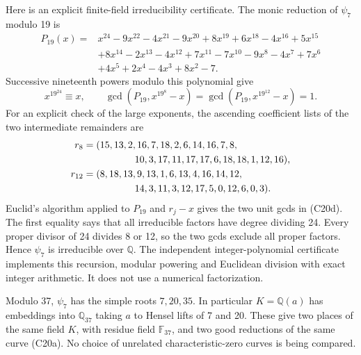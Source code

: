 \documentclass[11pt]{article}
\newcommand{\Q}{\mathbb Q}\newcommand{\C}{\mathbb C}\newcommand{\Z}{\mathbb Z}\newcommand{\R}{\mathbb R}\newcommand{\A}{\mathbb A}\newcommand{\OO}{\mathcal O}
\newcommand{\F}{\mathbb F}
\theoremstyle{definition}\newtheorem{definition}[theorem]{Definition}\newtheorem{remark}[theorem]{Remark}
\begin{document}
Here is an explicit finite-field irreducibility certificate.
The monic reduction of $\psi_7$ modulo 19 is
\begin{align*}
 P_{19}(x)={}&x^{24}-9x^{22}-4x^{21}-9x^{20}
       +8x^{19}+6x^{18}-4x^{16}+5x^{15}\\
 &+8x^{14}-2x^{13}-4x^{12}+7x^{11}-7x^{10}
       -9x^8-4x^7+7x^6\\
 &+4x^5+2x^4-4x^3+8x^2-7.
\end{align*}
Successive nineteenth powers modulo this polynomial give
\[
 x^{19^{24}}\equiv x,\qquad
 \gcd(P_{19},x^{19^8}-x)=
 \gcd(P_{19},x^{19^{12}}-x)=1.
 \tag{C20d}
\]
For an explicit check of the large exponents, the ascending
coefficient lists of the two intermediate remainders are
\[
\begin{split}
 r_8={}&(15,13,2,16,7,18,2,6,14,16,7,8,\\
       &\hspace{14mm}10,3,17,11,17,17,6,18,18,1,12,16),\\
 r_{12}={}&(8,18,13,9,13,1,6,13,4,16,14,12,\\
       &\hspace{14mm}14,3,11,3,12,17,5,0,12,6,0,3).
\end{split}
\]
Euclid's algorithm applied to $P_{19}$ and $r_j-x$ gives
the two unit gcds in (C20d). The first equality says that all
irreducible factors have degree dividing 24. Every proper
divisor of 24 divides 8 or 12, so the two gcds exclude all
proper factors. Hence $\psi_7$ is irreducible over $\Q$.
The independent integer-polynomial certificate
 implements this
recursion, modular powering and Euclidean division with exact
integer arithmetic. It does not use a numerical factorization.

Modulo 37, $\psi_7$ has the simple roots $7,20,35$.
In particular $K=\Q(a)$ has embeddings into $\Q_{37}$ taking
$a$ to Hensel lifts of 7 and 20. These give two places of the
same field $K$, with residue field $\F_{37}$, and two good
reductions of the same curve (C20a). No choice of unrelated
characteristic-zero curves is being compared.
\end{document}
